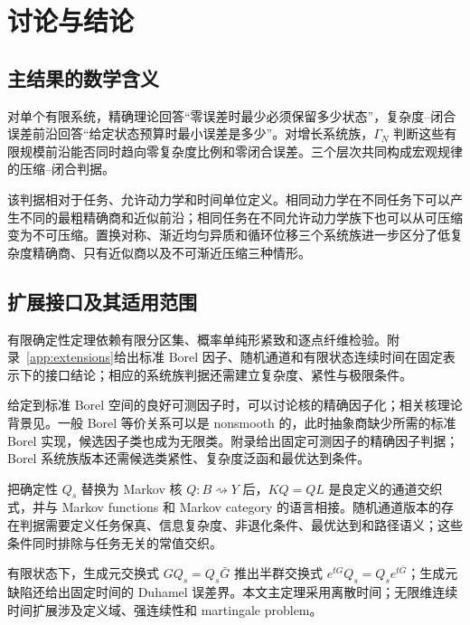 \section{讨论与结论}
\label{sec:discussion}

\subsection{主结果的数学含义}

对单个有限系统，精确理论回答“零误差时最少必须保留多少状态”，复杂度--闭合误差前沿回答“给定状态预算时最小误差是多少”。对增长系统族，$\Gamma_N$ 判断这些有限规模前沿能否同时趋向零复杂度比例和零闭合误差。三个层次共同构成宏观规律的压缩--闭合判据。

该判据相对于任务、允许动力学和时间单位定义。相同动力学在不同任务下可以产生不同的最粗精确商和近似前沿；相同任务在不同允许动力学族下也可以从可压缩变为不可压缩。置换对称、渐近均匀异质和循环位移三个系统族进一步区分了低复杂度精确商、只有近似商以及不可渐近压缩三种情形。

\subsection{扩展接口及其适用范围}

有限确定性定理依赖有限分区集、概率单纯形紧致和逐点纤维检验。附录~\ref{app:extensions}给出标准 Borel 因子、随机通道和有限状态连续时间在固定表示下的接口结论；相应的系统族判据还需建立复杂度、紧性与极限条件。

给定到标准 Borel 空间的良好可测因子时，可以讨论核的精确因子化；相关核理论背景见\citet{Kallenberg2021}。一般 Borel 等价关系可以是 nonsmooth 的，此时抽象商缺少所需的标准 Borel 实现\citep{Kechris1995}，候选因子类也成为无限类。附录给出固定可测因子的精确因子判据；Borel 系统族版本还需候选类紧性、复杂度泛函和最优达到条件。

把确定性 $Q_s$ 替换为 Markov 核 $Q:B\rightsquigarrow Y$ 后，$KQ=QL$ 是良定义的通道交织式，并与 Markov functions 和 Markov category 的语言相接\citep{RogersPitman1981,Fritz2020}。随机通道版本的存在判据需要定义任务保真、信息复杂度、非退化条件、最优达到和路径语义；这些条件同时排除与任务无关的常值交织。

有限状态下，生成元交换式 $GQ_s=Q_s\bar G$ 推出半群交换式 $e^{tG}Q_s=Q_se^{t\bar G}$；生成元缺陷还给出固定时间的 Duhamel 误差界。本文主定理采用离散时间；无限维连续时间扩展涉及定义域、强连续性和 martingale problem\citep{EthierKurtz1986}。

